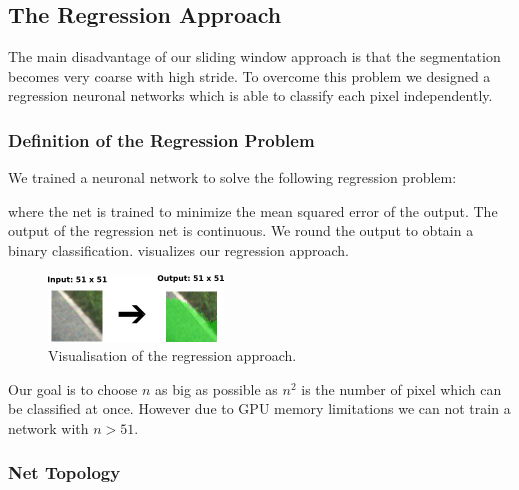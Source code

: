 \subsection{The Regression Approach}

The main disadvantage of our sliding window approach is that the segmentation becomes very coarse with high stride. To overcome this problem we designed a regression neuronal networks which is able to classify each pixel independently.

\subsubsection{Definition of the Regression Problem}

We trained a neuronal network to solve the following regression problem:


where the net is trained to minimize the mean squared error of the output. The output of the regression net is continuous. We round the output to obtain a binary classification.   visualizes our regression approach.

\begin{figure}[H]
	\centering
	\includegraphics[width=0.5\columnwidth]{figures/models/fully-conv.png}
	\caption{Visualisation of the regression approach.}
	\label{fig:reg}
\end{figure} 

Our goal is to choose $n$ as big as possible as $n^2$ is the number of pixel which can be classified at once. However due to GPU memory limitations we can not train a network with $n > 51$.





\subsubsection{Net Topology}

